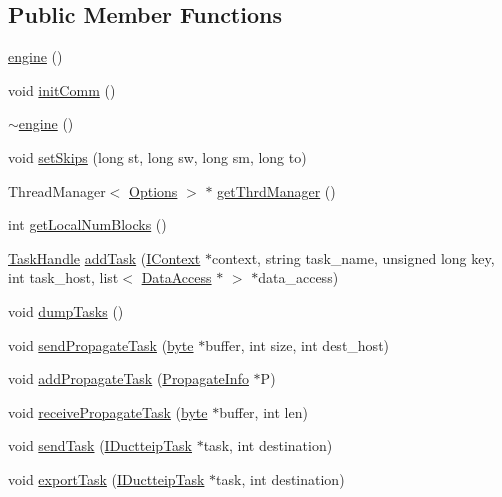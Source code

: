 \subsection*{Public Member Functions}
\begin{DoxyCompactItemize}
\item 
\hyperlink{classengine_aaffbfa4e20b4b627f2336eb6b40db348}{engine} ()
\item 
void \hyperlink{classengine_ac26f49a93305875e96b66807e9344f7d}{initComm} ()
\item 
\hyperlink{classengine_aa3557f06618b07672ae2350091d42577}{$\sim$engine} ()
\item 
void \hyperlink{classengine_aeac567ab02fa33c70071131e0ba5e25a}{setSkips} (long st, long sw, long sm, long to)
\item 
ThreadManager$<$ \hyperlink{struct_options}{Options} $>$ $\ast$ \hyperlink{classengine_a728694d16eb4a744fe56b39fed8eac85}{getThrdManager} ()
\item 
int \hyperlink{classengine_ac6030a50a4319513af7be72385d7837c}{getLocalNumBlocks} ()
\item 
\hyperlink{task_8hpp_a189c327d368d47849e32f5dfcb3c5f45}{TaskHandle} \hyperlink{classengine_aa22a2fc88b7283b840e6db1e45dbdd5b}{addTask} (\hyperlink{class_i_context}{IContext} $\ast$context, string task\_\-name, unsigned long key, int task\_\-host, list$<$ \hyperlink{struct_data_access}{DataAccess} $\ast$ $>$ $\ast$data\_\-access)
\item 
void \hyperlink{classengine_a8e205e47882728401e1b71805ddf802a}{dumpTasks} ()
\item 
void \hyperlink{classengine_a8cca3e07a3c37e5f7af11da6a81f16c5}{sendPropagateTask} (\hyperlink{engine_8hpp_a0c8186d9b9b7880309c27230bbb5e69d}{byte} $\ast$buffer, int size, int dest\_\-host)
\item 
void \hyperlink{classengine_a9d0024f21ae5fa522fefdd38eade0a2e}{addPropagateTask} (\hyperlink{struct_propagate_info}{PropagateInfo} $\ast$P)
\item 
void \hyperlink{classengine_a21127e8807bf1984daa2806e056aef9c}{receivePropagateTask} (\hyperlink{engine_8hpp_a0c8186d9b9b7880309c27230bbb5e69d}{byte} $\ast$buffer, int len)
\item 
void \hyperlink{classengine_a6db82799db55ccddd3d79093eeb3a16b}{sendTask} (\hyperlink{class_i_ductteip_task}{IDuctteipTask} $\ast$task, int destination)
\item 
void \hyperlink{classengine_ab64370db1774805a8fbe041bdde1a01c}{exportTask} (\hyperlink{class_i_ductteip_task}{IDuctteipTask} $\ast$task, int destination)

\end{DoxyCompactItemize}
